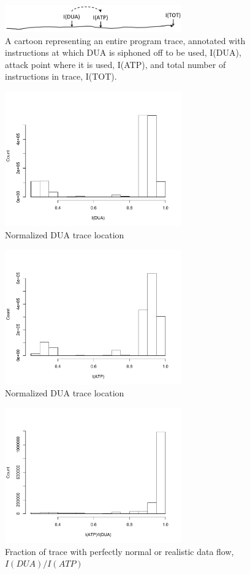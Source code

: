 \begin{figure}
\centering
\includegraphics[width=3in]{trace-dua-atp.png}
\caption{A cartoon representing an entire program trace, annotated with instructions at which DUA is siphoned off to be used, I(DUA), attack point where it is used, I(ATP), and total number of instructions in trace, I(TOT).}
\label{fig:taint-compute-number}
\end{figure}

\begin{figure}
\centering
\includegraphics[width=3in]{dua.pdf}
\caption{Normalized DUA trace location}
\label{fig:dua-hist}
\end{figure}

\begin{figure}
\centering
\includegraphics[width=3in]{atp.pdf}
\caption{Normalized DUA trace location}
\label{fig:atp-hist}

\end{figure}
\begin{figure}
\centering
\includegraphics[width=3in]{rdf.pdf}
\caption{Fraction of trace with perfectly normal or realistic data flow, $I(DUA)/I(ATP)$}
\label{fig:rdf-hist}
\end{figure}




